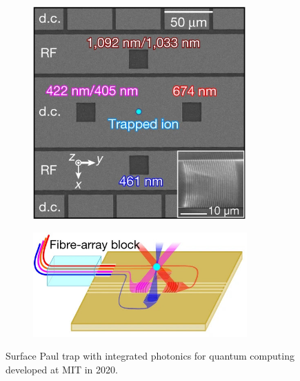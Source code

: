 \begin{figure}[H]
    \centering
    \begin{subfigure}[b]{0.45\textwidth}
        \centering
        \includegraphics[width=0.9\textwidth]{images/TIQC_MIT_1.jpg}
    \end{subfigure}
    \hfill
    \begin{subfigure}[b]{0.45\textwidth}
        \centering
        \includegraphics[width=0.9\textwidth]{images/TIQC_MIT_2.jpg}
    \end{subfigure}
    \caption{Surface Paul trap with integrated photonics for quantum computing developed at MIT in 2020.}\label{fig:TIQC_MIT}
\end{figure}

